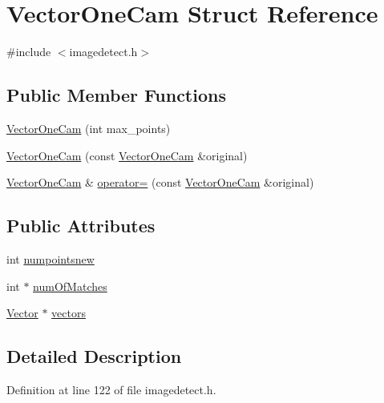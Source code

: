 \hypertarget{struct_vector_one_cam}{}\section{Vector\+One\+Cam Struct Reference}
\label{struct_vector_one_cam}


{\ttfamily \#include $<$imagedetect.\+h$>$}

\subsection*{Public Member Functions}
\begin{DoxyCompactItemize}
\item 
\mbox{\hyperlink{struct_vector_one_cam_afa5cf86b4937421b8d5b67f6db71cd54}{Vector\+One\+Cam}} (int max\+\_\+points)
\item 
\mbox{\hyperlink{struct_vector_one_cam_ac940047671878f6d2220bf548255fe6e}{Vector\+One\+Cam}} (const \mbox{\hyperlink{struct_vector_one_cam}{Vector\+One\+Cam}} \&original)
\item 
\mbox{\hyperlink{struct_vector_one_cam}{Vector\+One\+Cam}} \& \mbox{\hyperlink{struct_vector_one_cam_a08ff98d8cc920d174b7d1cd15f9c4275}{operator=}} (const \mbox{\hyperlink{struct_vector_one_cam}{Vector\+One\+Cam}} \&original)
\end{DoxyCompactItemize}
\subsection*{Public Attributes}
\begin{DoxyCompactItemize}
\item 
int \mbox{\hyperlink{struct_vector_one_cam_a501707a86a9927a08fdc8ff7a60f20b6}{numpointsnew}}
\item 
int $\ast$ \mbox{\hyperlink{struct_vector_one_cam_a7878ff51411b0436ed942d686e0cf98f}{num\+Of\+Matches}}
\item 
\mbox{\hyperlink{struct_vector}{Vector}} $\ast$ \mbox{\hyperlink{struct_vector_one_cam_abf5305db443c509558f2be958f484705}{vectors}}
\end{DoxyCompactItemize}


\subsection{Detailed Description}


Definition at line 122 of file imagedetect.\+h.



